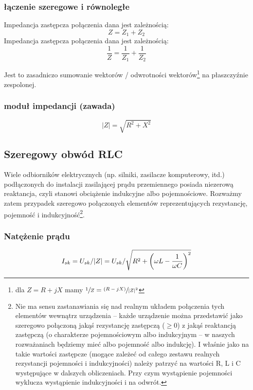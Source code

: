 \subsubsection{łączenie szeregowe i równoległe}

Impedancja zastępcza połączenia  dana jest zależnością: $$Z = Z_1 + Z_2$$
Impedancja zastępcza połączenia  dana jest zależnością: $$\frac{1}{Z} = \frac{1}{Z_1} + \frac{1}{Z_2}$$

\noindent
Jest to zasadniczo sumowanie wektorów / odwrotności wektorów\footnote{
	dla $Z = R + jX$ mamy $\sfrac{1}{Z} = \sfrac{(R - jX)}{|Z|^2}$
} na płaszczyźnie zespolonej.

\subsubsection{moduł impedancji (zawada)}

$$|Z| = \sqrt{R^2 + X^2}$$


\subsection{Szeregowy obwód RLC}

Wiele odbiorników elektrycznych (np. silniki, zasilacze komputerowy, itd.) podłączonych do instalacji zasilającej prądu przemiennego posiada niezerową reaktancja, czyli stanowi obciążenie indukcyjne albo pojemnościowe. Rozważmy zatem przypadek szeregowo połączonych elementów reprezentujących rezystancję, pojemność i indukcyjność\footnote{
	Nie ma sensu zastanawiania się nad realnym układem połączenia tych elementów wewnątrz urządzenia
		– każde urządzenie można przedstawić jako szeregowo połączoną jakąś rezystancję zastępczą ($\ge 0$)
		z jakąś reaktancją zastępczą (o charakterze pojemnościowym albo indukcyjnym – w naszych rozważaniach będziemy mieć albo pojemność albo indukcję).
	I właśnie jako na takie wartości zastępcze (mogące zależeć od całego zestawu realnych rezystancji pojemności i indukcyjności) należy patrzyć na wartości R, L i C występujące w dalszych obliczeniach. Przy czym wystąpienie pojemności wyklucza wystąpienie indukcyjności i na odwrót.
}.


\subsubsection{Natężenie prądu}

$$I_{sk} = U_{sk} / |Z| = U_{sk} / \sqrt{R^2 + \left(\omega L - { 1 \over \omega C}\right)^2}$$

